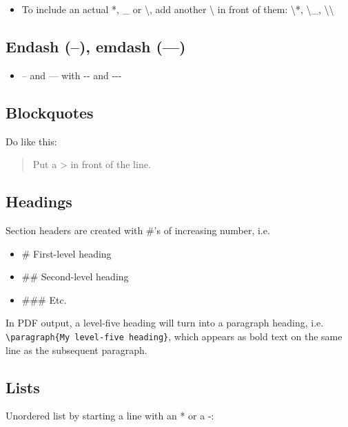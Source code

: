 \documentclass[a4paper,nobind]{templates/ociamthesis}
\providecommand{\tightlist}{%
  \setlength{\itemsep}{0pt}\setlength{\parskip}{0pt}}
\begin{document}
\begin{itemize}
\tightlist
\item
  To include an actual *, \_ or \textbackslash{}, add another
  \textbackslash{} in front of them: \textbackslash{}*,
  \textbackslash{}\_, \textbackslash{}\textbackslash{}
\end{itemize}

\subsection{Endash (--), emdash (---)}\label{endash-emdash}

\begin{itemize}
\tightlist
\item
  -- and --- with -\/- and -\/-\/-
\end{itemize}

\subsection{Blockquotes}\label{blockquotes}

Do like this:

\begin{quote}
Put a \textgreater{} in front of the line.
\end{quote}

\subsection{Headings}\label{headings}

Section headers are created with \#'s of increasing number, i.e.

\begin{itemize}
\tightlist
\item
  \# First-level heading
\item
  \#\# Second-level heading
\item
  \#\#\# Etc.
\end{itemize}

In PDF output, a level-five heading will turn into a paragraph heading,
i.e. \texttt{\textbackslash{}paragraph\{My\ level-five\ heading\}},
which appears as bold text on the same line as the subsequent paragraph.

\subsection{Lists}\label{lists}

Unordered list by starting a line with an * or a -:
\end{document}
